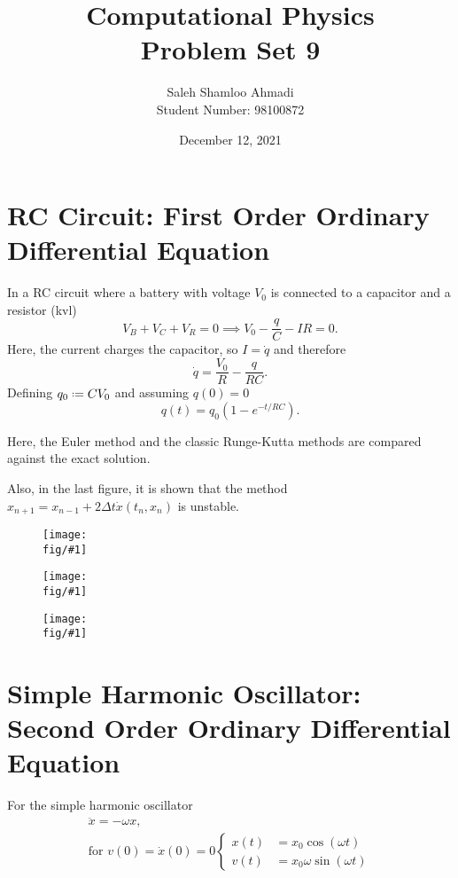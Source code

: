 \documentclass[12pt,a4paper]{article}
\title{Computational Physics\\Problem Set 9}
\author{Saleh Shamloo Ahmadi\\Student Number: 98100872}
\date{December 12, 2021}
\newcommand{\fig}{../fig}
\newcommand{\fighere}[2]{\begin{figure}[htb!]
    \centering
    \texttt{[image: \\fig/\#1]}
\end{figure}}
\newcommand*{\defeq}{\mathrel{\vcenter{\baselineskip0.5ex \lineskiplimit0pt
			\hbox{\scriptsize.}\hbox{\scriptsize.}}}
			=}
\begin{document}
	\maketitle
    \section{RC Circuit: First Order Ordinary Differential Equation}
    In a RC circuit where a battery with voltage $V_0$ is connected to a capacitor and a resistor (kvl)
    \begin{equation}
        V_B + V_C + V_R = 0 \implies V_0 - \frac{q}{C} - IR = 0.
    \end{equation}
    Here, the current charges the capacitor, so $I = \dot{q}$ and therefore
    \begin{equation}
        \dot{q} = \frac{V_0}{R} - \frac{q}{RC}.
    \end{equation}
    Defining $q_0 \defeq CV_0$ and assuming $q(0) = 0$
    \begin{equation}
        q(t) = q_0(1 - e^{-t/RC}).
    \end{equation}
    
    Here, the Euler method and the classic Runge-Kutta methods are compared against the exact solution.

    Also, in the last figure, it is shown that the method $x_{n+1} = x_{n-1} + 2\Delta{t}\dot{x}(t_n, x_n)$
    is unstable.

    \thispagestyle{empty}
    \fighere{rc-sol}{0.86}
    \fighere{rc-error}{1}
    \fighere{rc-unstable}{0.86}
    \restoregeometry
    \section{Simple Harmonic Oscillator:\\Second Order Ordinary Differential Equation}
    For the simple harmonic oscillator
    \begin{gather}
        \ddot{x} = -\omega x, \\
        \text{for $v(0) = \dot{x}(0) = 0$}
        \left\{\begin{aligned}
            x(t) &= x_0\cos(\omega t) \\
            v(t) &= x_0\omega\sin(\omega t)
        \end{aligned}\right.
    \end{gather}
\end{document}
